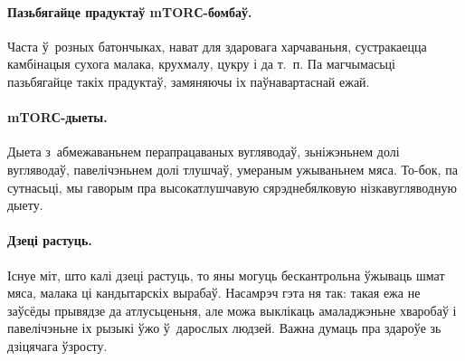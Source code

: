 \paragraph{Пазьбягайце прадуктаў mTORС-бомбаў.}
Часта ў~розных батончыках, нават для здаровага харчаваньня, сустракаецца камбінацыя сухога малака, крухмалу, цукру і да т.~п. Па магчымасьці пазьбягайце такіх прадуктаў, замяняючы іх паўнавартаснай ежай.

\paragraph{mTORС-дыеты.}
Дыета з~абмежаваньнем перапрацаваных вугляводаў, зьніжэньнем долі вугляводаў, павелічэньнем долі тлушчаў, умераным ужываньнем мяса. То-бок, па сутнасьці, мы гаворым пра высокатлушчавую сярэднебялковую нізкавугляводную дыету.

\paragraph{Дзеці растуць.}
Існуе міт, што калі дзеці растуць, то яны могуць бескантрольна ўжываць шмат мяса, малака ці кандытарскіх вырабаў. Насамрэч гэта ня так: такая ежа не заўсёды прывядзе да атлусьценьня, але можа выклікаць амаладжэньне хваробаў і павелічэньне іх рызыкі ўжо ў~дарослых людзей. Важна думаць пра здароўе зь дзіцячага ўзросту.
